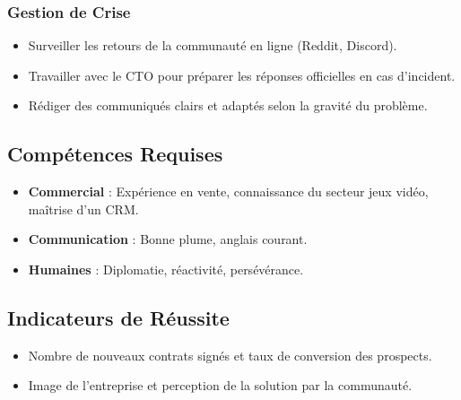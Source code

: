 \documentclass[12pt,a4paper]{article}
\begin{document}
\subsubsection{Gestion de Crise}
\begin{itemize}[label=\textbullet]
    \item Surveiller les retours de la communauté en ligne (Reddit, Discord).
    \item Travailler avec le CTO pour préparer les réponses officielles en cas d'incident.
    \item Rédiger des communiqués clairs et adaptés selon la gravité du problème.
\end{itemize}

\subsection{Compétences Requises}
\begin{itemize}[label=\textbullet]
    \item \textbf{Commercial} : Expérience en vente, connaissance du secteur jeux vidéo, maîtrise d'un CRM.
    \item \textbf{Communication} : Bonne plume, anglais courant.
    \item \textbf{Humaines} : Diplomatie, réactivité, persévérance.
\end{itemize}

\subsection{Indicateurs de Réussite}
\begin{itemize}[label=\textbullet]
    \item Nombre de nouveaux contrats signés et taux de conversion des prospects.
    \item Image de l'entreprise et perception de la solution par la communauté.
\end{itemize}
\end{document}
